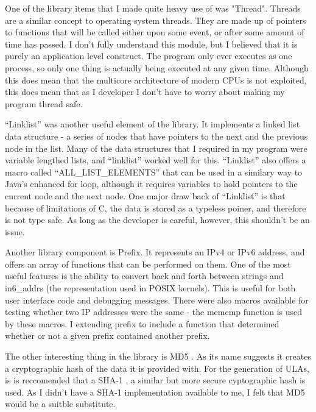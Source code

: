 \documentclass[12pt]{report}
\begin{document}
One of the library items that I made quite heavy use of was "Thread". Threads 
are a similar concept to operating system threads. They are made up of pointers 
to functions that will be called either upon some event, or after some amount of 
time has passed. I don't fully understand this module, but I believed that it is 
purely an application level construct. The program only ever executes as one 
process, so only one thing is actually being executed at any given time. 
Although this does mean that the multicore architecture of modern CPUs 
 is not exploited, this does mean 
that as I developer I don't have to worry about making my program thread safe.

``Linklist'' was another useful element of the library. It implements a linked 
list data structure - a series of nodes that have pointers to the next and the 
previous node in the list. Many of the data structures that I required in my 
program were variable lengthed lists, and ``linklist'' worked well for this. 
``Linklist'' also offers a macro called ``ALL\_LIST\_ELEMENTS'' that can be used 
in a similary way to Java's enhanced for loop, although it requires variables to 
hold pointers to the current node and the next node. One major draw back of 
``Linklist'' is that because of limitations of C, the data is stored as a 
typeless poiner, and therefore is not type safe. As long as the developer is 
careful, however, this shouldn't be an issue. 

Another library component is Prefix. It represents an IPv4 or IPv6 address, and 
offers an array of functions that can be performed on them. One of the most 
useful features is the ability to convert back and forth between strings and 
in6\_addrs (the representation used in POSIX kernels). This is useful for both 
user interface code and debugging messages. There were also macros available for 
testing whether two IP addresses were the same - the memcmp function is used by 
these macros. I extending prefix to include a function that determined whether
or not a given prefix contained another prefix. 

The other interesting thing in the library is MD5 
. As its name suggests it creates 
a cryptographic hash of  the data it is provided with. For the generation of 
ULAs, is is reccomended that a SHA-1 
, a similar but more secure 
cyptographic hash is used. As I didn't have a SHA-1 implementation available to
me, I felt that MD5 would be a suitble substitute. 
\end{document}
